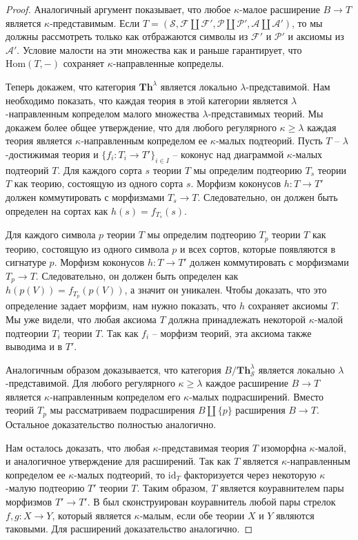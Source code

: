 \documentclass[reqno]{amsart}
\theoremstyle{definition}
\theoremstyle{remark}
\newcommand{\bcat}[1]{\mathbf{#1}}
\newcommand{\fs}[1]{\mathrm{#1}}
\newcommand{\Hom}{\fs{Hom}}
\newcommand{\Th}{\bcat{Th}}
\begin{document}
\begin{proof}
Аналогичный аргумент показывает, что любое $\kappa$-малое расширение $B \to T$ является $\kappa$-представимым.
Если $T = (\mathcal{S}, \mathcal{F} \amalg \mathcal{F}', \mathcal{P} \amalg \mathcal{P}', \mathcal{A} \amalg \mathcal{A}')$, то мы должны рассмотреть только как отбражаются символы из $\mathcal{F}'$ и $\mathcal{P}'$ и аксиомы из $\mathcal{A}'$.
Условие малости на эти множества как и раньше гарантирует, что $\Hom(T,-)$ сохраняет $\kappa$-направленные копределы.

Теперь докажем, что категория $\Th^\lambda$ является локально $\lambda$-представимой.
Нам необходимо показать, что каждая теория в этой категории является $\lambda$-направленным копределом малого множества $\lambda$-представимых теорий.
Мы докажем более общее утверждение, что для любого регулярного $\kappa \geq \lambda$ каждая теория является $\kappa$-направленным копределом ее $\kappa$-малых подтеорий.
Пусть $T$ -- $\lambda$-достижимая теория и $\{ f_i : T_i \to T' \}_{i \in I}$ -- коконус над диаграммой $\kappa$-малых подтеорий $T$.
Для каждого сорта $s$ теории $T$ мы определим подтеорию $T_s$ теории $T$ как теорию, состоящую из одного сорта $s$.
Морфизм коконусов $h : T \to T'$ должен коммутировать с морфизмами $T_s \to T$.
Следовательно, он должен быть определен на сортах как $h(s) = f_{T_s}(s)$.

Для каждого символа $p$ теории $T$ мы определим подтеорию $T_p$ теории $T$ как теорию, состоящую из одного символа $p$ и всех сортов, которые появляются в сигнатуре $p$.
Морфизм коконусов $h : T \to T'$ должен коммутировать с морфизмами $T_p \to T$.
Следовательно, он должен быть определен как $h(p(V)) = f_{T_p}(p(V))$, а значит он уникален.
Чтобы доказать, что это определение задает морфизм, нам нужно показать, что $h$ сохраняет аксиомы $T$.
Мы уже видели, что любая аксиома $T$ должна принадлежать некоторой $\kappa$-малой подтеории $T_i$ теории $T$.
Так как $f_i$ -- морфизм теорий, эта аксиома также выводима и в $T'$.

Аналогичным образом доказывается, что категория $B/\Th_\mathcal{S}^\lambda$ является локально $\lambda$-представимой.
Для любого регулярного $\kappa \geq \lambda$ каждое расширение $B \to T$ является $\kappa$-направленным копределом его $\kappa$-малых подрасширений.
Вместо теорий $T_p$ мы рассматриваем подрасширения $B \amalg \{ p \}$ расширения $B \to T$.
Остальное доказательство полностью аналогично.

Нам осталось доказать, что любая $\kappa$-представимая теория $T$ изоморфна $\kappa$-малой, и аналогичное утверждение для расширений.
Так как $T$ является $\kappa$-направленным копределом ее $\kappa$-малых подтеорий, то $\fs{id}_T$ факторизуется через некоторую $\kappa$-малую подтеорию $T'$ теории $T$.
Таким образом, $T$ является коуравнителем пары морфизмов $T' \to T'$.
В  был сконструирован коуравнитель любой пары стрелок $f,g : X \to Y$, который является $\kappa$-малым, если обе теории $X$ и $Y$ являются таковыми.
Для расширений доказательство аналогично.
\end{proof}
\end{document}
